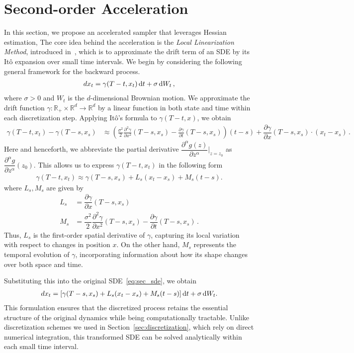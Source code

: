 \documentclass[11pt]{article}
\def\rmd{{\,\rm d}}
\def\R{\mathbb R}
\begin{document}
\section{Second-order Acceleration}
\label{sec:accleration}
In this section, we propose an accelerated sampler that leverages Hessian estimation, %
The core idea behind the acceleration is the \textit{Local Linearization Method}, introduced in~\cite{Shoji1998}, which is to approximate the drift term of an SDE by its Itô expansion over small time intervals. 
We begin by considering the following general framework for the backward process.
\begin{align}
\label{eq:sec_sde}
dx_t=\gamma(T-t,x_t)\rmd t+\sigma \rmd W_t\,,
\end{align}
where $\sigma>0$ and $W_t$ is the $d$-dimensional Brownian motion.
We approximate the drift function $\gamma:\R_+\times\R^d\to \R^d$ by a linear function in both state and time within each discretization step. 
Applying Itô's formula to $\gamma(T-t,x)$, we obtain
\begin{align*}
\gamma(T-t,x_t)-\gamma(T-s,x_s)
&\approx\left(\frac{\sigma^2}{2}\frac{\partial^2 \gamma}{\partial x^2}(T-s,x_s)-\frac{\partial \gamma}{\partial t}(T-s,x_s)\right)(t-s) +\dfrac{\partial \gamma}{\partial x}(T-s,x_s)\cdot(x_t-x_s)\,.
\end{align*}
Here and henceforth, we abbreviate the partial derivative $\dfrac{\partial^{\alpha}g(z)}{\partial z^{\alpha}}\bigg|_{z=z_0}$ as $\dfrac{\partial^{\alpha}g}{\partial z^{\alpha}}(z_0)$. This allows us to express $\gamma(T-t,x_t)$ in the following form
\begin{align*}
\gamma(T-t,x_t)\approx \gamma(T-s,x_s)+L_s(x_t-x_s)+M_s(t-s).
\end{align*}
where $L_s, M_s$ are given by
\begin{align*}
L_s&=\dfrac{\partial \gamma}{\partial x}(T-s,x_s)\\
M_s&=\dfrac{\sigma^2}{2}\dfrac{\partial^2 \gamma}{\partial x^2}(T-s,x_s)-\dfrac{\partial \gamma}{\partial t}(T-s,x_s)\,.
\end{align*}
{Thus, $L_s$ is the first-order spatial derivative of $\gamma$, capturing its local variation with respect to changes in position $x$. 
On the other hand, $M_s$ represents the temporal evolution of $\gamma$, incorporating information about how its shape changes over both space and time.
}

Substituting this into the original SDE~\eqref{eq:sec_sde}, we obtain
\begin{align*}
dx_t=[\gamma(T-s,x_s)+L_s(x_t-x_s)+M_s(t-s)]\rmd t+\sigma \rmd W_t.
\end{align*}
This formulation ensures that the discretized process retains the essential structure of the original dynamics while being computationally tractable. 
Unlike discretization schemes we used in Section~\ref{sec:discretization}, which rely on direct numerical integration, this transformed SDE can be solved analytically within each small time interval. 
\end{document}

